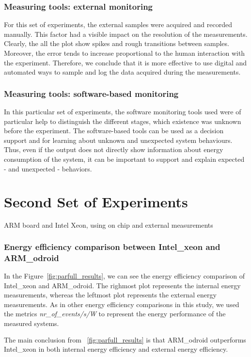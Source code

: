 \subsubsection*{Measuring tools: external monitoring}
For this set of experiments, the external samples were acquired and recorded 
manually. This factor had a visible impact on the resolution of the measurements. Clearly,
the all the plot show spikes and rough transitions between samples. Moreover, the error
tends to increase proportional to the human interaction with the experiment. 
Therefore, we conclude that it is more effective to use digital and automated ways to sample and
log the data acquired during the measurements.

\subsubsection*{Measuring tools: software-based monitoring}
In this particular set of experiments, the software monitoring tools used were
of particular help to distinguish the different stages, which existence was
unknown before the experiment. The software-based tools can be used as a 
decision support and for learning about unknown and unexpected system behaviours. Thus, even if the output
does not directly show information about energy consumption of the system, it
can be important to support and explain expected - and unexpected - behaviors.
  

\section{Second Set of Experiments}
ARM board and Intel Xeon, using on chip and external measurements

\subsubsection*{Energy efficiency comparison between Intel\_xeon and ARM\_odroid}

In the Figure~\ref{fig:parfull_results}, we can see the energy efficiency comparison of Intel\_xeon and ARM\_odroid. The righmost plot represents the internal energy measurements, whereas the leftmost plot represents the external energy measurements. As in other energy efficiency comparisons in this study, we used the metrics \textit{nr\_of\_events/s/W} to represent the energy performance of the measured systems. 

The main conclusion from ~\ref{fig:parfull_results} is that ARM\_odroid outperforms Intel\_xeon in both internal energy efficiency and external energy efficiency.

